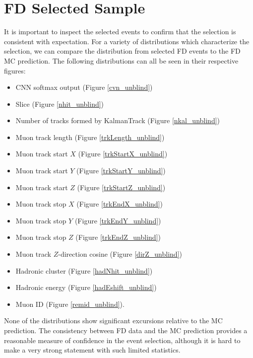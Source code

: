 \section{FD Selected Sample}
\label{fd_selection_result_section}

It is important to inspect the selected events to confirm that
the selection is consistent with expectation.
For a variety of distributions which characterize the selection,
we can compare the distribution from selected FD events
to the FD MC prediction.
The following distributions can all be seen in their respective figures:
\begin{itemize}
  \item CNN softmax output (Figure \ref{cvn_unblind})
  \item Slice \nhit (Figure \ref{nhit_unblind})
  \item Number of tracks formed by KalmanTrack (Figure \ref{nkal_unblind})
  \item Muon track length (Figure \ref{trkLength_unblind})
  \item Muon track start $X$ (Figure \ref{trkStartX_unblind})
  \item Muon track start $Y$ (Figure \ref{trkStartY_unblind})
  \item Muon track start $Z$ (Figure \ref{trkStartZ_unblind})
  \item Muon track stop $X$ (Figure \ref{trkEndX_unblind})
  \item Muon track stop $Y$ (Figure \ref{trkEndY_unblind})
  \item Muon track stop $Z$ (Figure \ref{trkEndZ_unblind})
  \item Muon track $Z$-direction cosine (Figure \ref{dirZ_unblind})
  \item Hadronic cluster \nhit (Figure \ref{hadNhit_unblind})
  \item Hadronic energy (Figure \ref{hadEshift_unblind})
  \item Muon ID (Figure \ref{remid_unblind}).
\end{itemize}
None of the distributions show significant excursions relative to the
MC prediction.
The consistency between FD data and the MC prediction provides
a reasonable measure of confidence in the event selection,
although it is hard to make a very strong statement
with such limited statistics.




